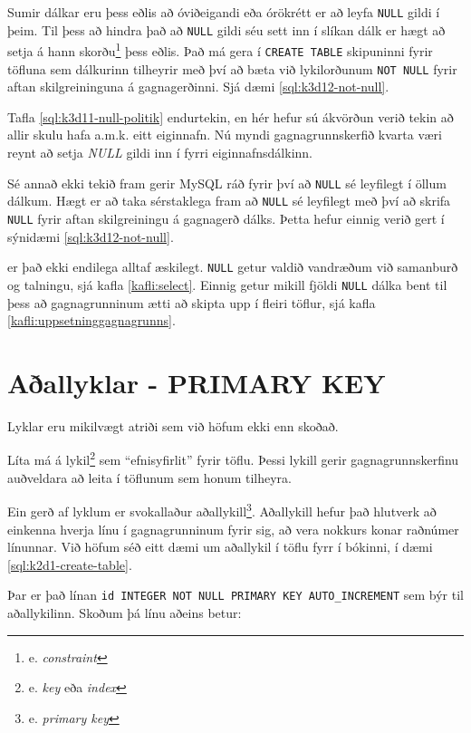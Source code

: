 Sumir dálkar eru þess eðlis að óviðeigandi eða órökrétt er að leyfa \verb|NULL| gildi í þeim. Til þess að hindra það að \verb|NULL| gildi séu sett inn í slíkan dálk er hægt að setja á hann skorðu\footnote{e. \emph{constraint}} þess eðlis. Það má gera í \verb|CREATE TABLE| skipuninni fyrir töfluna sem dálkurinn tilheyrir með því að bæta við lykilorðunum \verb|NOT NULL| fyrir aftan skilgreininguna á gagnagerðinni. Sjá dæmi \ref{sql:k3d12-not-null}.

\begin{example}
\caption[NOT NULL]{Tafla \ref{sql:k3d11-null-politik} endurtekin, en hér hefur sú ákvörðun verið tekin að allir skulu hafa a.m.k. eitt eiginnafn. Nú myndi gagnagrunnskerfið kvarta væri reynt að setja \emph{NULL} gildi inn í fyrri eiginnafnsdálkinn.}
\label{sql:k3d12-not-null}
\centering
{}
\end{example}

Sé annað ekki tekið fram gerir MySQL ráð fyrir því að \verb|NULL| sé leyfilegt í öllum dálkum. Hægt er að taka sérstaklega fram að \verb|NULL| sé leyfilegt með því að skrifa \verb|NULL| fyrir aftan skilgreiningu á gagnagerð dálks. Þetta hefur einnig verið gert í sýnidæmi \ref{sql:k3d12-not-null}.

 er það ekki endilega alltaf æskilegt. \verb|NULL| getur valdið vandræðum við samanburð og talningu, sjá kafla \ref{kafli:select}. Einnig getur mikill fjöldi \verb|NULL| dálka bent til þess að gagnagrunninum ætti að skipta upp í fleiri töflur, sjá kafla \ref{kafli:uppsetninggagnagrunns}.

\section{Aðallyklar - PRIMARY KEY} %
\label{undirkafli:adallyklar-kynning}
Lyklar eru mikilvægt atriði sem við höfum ekki enn skoðað.

Líta má á lykil\footnote{e. \emph{key} eða \emph{index}} sem ``efnisyfirlit'' fyrir töflu. Þessi lykill gerir gagnagrunnskerfinu auðveldara að leita í töflunum sem honum tilheyra.

Ein gerð af lyklum er svokallaður aðallykill\footnote{e. \emph{primary key}}. Aðallykill hefur það hlutverk að einkenna hverja línu í gagnagrunninum fyrir sig, að vera nokkurs konar raðnúmer línunnar. Við höfum séð eitt dæmi um aðallykil í töflu fyrr í bókinni, í dæmi \ref{sql:k2d1-create-table}.

Þar er það línan \verb|id INTEGER NOT NULL PRIMARY KEY AUTO_INCREMENT| sem býr til aðallykilinn. Skoðum þá línu aðeins betur:

